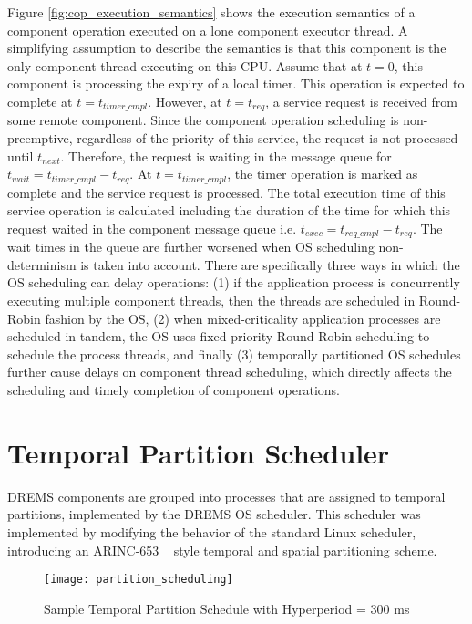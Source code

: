 Figure \ref{fig:cop_execution_semantics} shows the execution semantics of a component operation executed on a lone component executor thread. A simplifying assumption  to describe the semantics is that this component is the only component thread executing on this CPU. Assume that at $t=0$, this component is processing the expiry of a local timer. This operation is expected to complete at $t = t_{timer\_cmpl}$. However, at $t = t_{req}$, a service request is received from some remote component. Since the component operation scheduling is non-preemptive, regardless of the priority of this service, the request is not processed until $t_{next}$. Therefore, the request is waiting in the message queue for $t_{wait} = t_{timer\_cmpl} - t_{req}$. At $t = t_{timer\_cmpl}$, the timer operation is marked as complete and the service request is processed. The total execution time of this service operation is calculated including the duration of the time for which this request waited in the component message queue i.e. $t_{exec} = t_{req\_cmpl} - t_{req}$. The wait times in the queue are further worsened when OS scheduling non-determinism is taken into account. There are specifically three ways in which the OS scheduling can delay operations: (1) if the application process is concurrently executing multiple component threads, then the threads are scheduled in Round-Robin fashion by the OS, (2) when mixed-criticality application processes are scheduled in tandem, the OS uses fixed-priority Round-Robin scheduling to schedule the process threads, and finally (3) temporally partitioned OS schedules further cause delays on component thread scheduling, which directly affects the scheduling and timely completion of component operations. 

\section{Temporal Partition Scheduler}

DREMS components are grouped into processes that are assigned to temporal partitions, implemented by the DREMS OS scheduler. This scheduler was implemented by modifying the behavior of the standard Linux scheduler, introducing an ARINC-653 ~\cite{ARINC-653} style temporal and spatial partitioning scheme. 

\begin{figure}[ht]
	\centering
	\texttt{[image: partition\_scheduling]}
	\caption{Sample Temporal Partition Schedule with Hyperperiod = 300 ms}
	\label{fig:partition_scheduling}
\end{figure}


